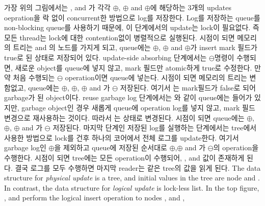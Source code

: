 %
\ifkor
가장 위의 그림에서는  ,  and
가 각각 $\oplus$, $\oplus$ and
$\oplus$에 해당하는 3개의 updates oepration을 락 없이 concurrent한 방법으로 log를 저장한다.
Log를 저장하는 queue를 non-blocking queue를 사용하기 때문에, 이 단계에서의 update는 lock이 필요없다. 
즉 모든 thread는 lock에 대한 contention없이 병렬적으로 실행된다. 
 시점이 되면 메모리의 트리는  and 의 노드를 가지게 되고, queue에는 
$\oplus$, $\oplus$ and $\oplus$가 insert mark 필드가
true로 된 상태로 저장되어 있다. 
update-side absorbing 단계에서는  $\ominus$명령이 수행되면, 새로운 object를 queue에 넣지
않고, mark 필드만 atomic하게 true로 수정한다.  
만약 처음 수행되는 $\ominus$ operation이면 queue에 넣는다.
 시점이 되면 메모리의 트리는 변함없고, queue에는 
$\oplus$, $\oplus$, $\oplus$ and 가
$\ominus$ 저장된다. 여기서 는 mark필드가 false로 되어 garbage가 된 object이다.
reuse garbage log 단계에서는 와 같이 queue에는 들어가 있지만, garbage object인 경우 새롭게
queue에 operation log를 넣지 않고, mark 필드 변경으로 재사용하는 것이다. 
따라서 는  상태로 변경된다. 
 시점이 되면 queue에는 
$\oplus$, $\oplus$, $\oplus$ and 가
$\ominus$ 저장된다.
마지막 단계인 저장된 log를 실행하는 단계에서는 tree에서 사용한 방법으로 lock를 건후 하나의 코어에서 
전체 로그를 update한다. 여기서 garbage log인  $\oplus$을 제외하고 queue에 저장된 순서대로 
$\oplus$,$\oplus$ and 가 $\ominus$의 operation을
수행한다.  시점이 되면 tree에는 
모든 operation이 수행되어, ,  and  값이 존재하게 된다.
결국 로그를 모두 수행하면 마지막 reader는 같은 tree의 값을 읽게 된다. 
\else
The data structure for \emph{physical update} is a tree, and initial values in
the tree are node  and .
In contrast, the data structure for \emph{logical update} is lock-less list.
In the top figure, ,  and  perform the
logical insert operation to nodes ,  and ,
